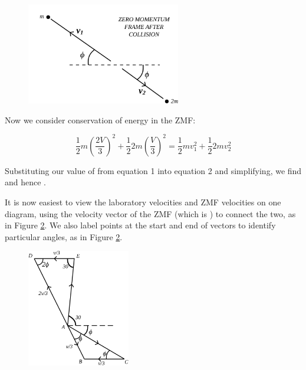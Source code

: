 \begin{problem}
{\begin{enumerate}
\begin{figure}[h]
	\centering
	\includegraphics[width=0.6\textwidth]{../../../figures/dynamics_tripos_inelastic_zmf_2.svg}
	\caption{}\label{fig:Tripos_Inelastic_ZMF_2}
\end{figure}


Now we consider conservation of energy in the ZMF:

\begin{equation}
\frac{1}{2}m\left(\frac{2V}{3}\right)^2+\frac{1}{2}2m\left(\frac{V}{3}\right)^2=\frac{1}{2}mv_1^2+\frac{1}{2}2mv_2^2
\end{equation}

Substituting our value of  from equation 1 into equation 2 and simplifying, we find  and hence . 

It is now easiest to view the laboratory velocities and ZMF velocities on one diagram, using the velocity vector of the ZMF (which is ) to connect the two, as in Figure \ref{fig:Tripos_Inelastic_ZMF_3}. We also label points at the start and end of vectors to identify particular angles, as in Figure \ref{fig:Tripos_Inelastic_ZMF_3}. 


\begin{figure}[h]
	\centering
	\includegraphics[width=0.4\textwidth]{../../../figures/dynamics_tripos_inelastic_zmf_3.svg}
	\caption{}\label{fig:Tripos_Inelastic_ZMF_3}
\end{figure}


\end{enumerate}}
\end{problem}
